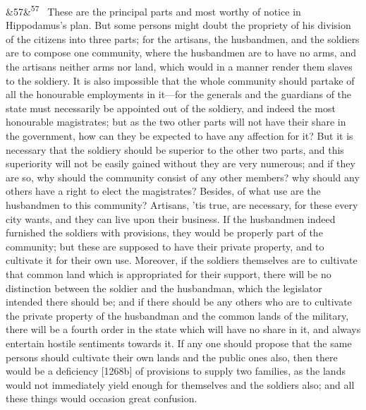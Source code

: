 \documentclass[12pt]{article}
\newcommand{\para}[1][]{\par\noindent\ifx&#1&\else\textsuperscript{\footnotesize #1}~\fi}
\begin{document}
\para[57] These are the principal parts and most worthy of notice in Hippodamus's plan. But some persons might doubt the propriety of his division of the citizens into three parts; for the artisans, the husbandmen, and the soldiers are to compose one community, where the husbandmen are to have no arms, and the artisans neither arms nor land, which would in a manner render them slaves to the soldiery. It is also impossible that the whole community should partake of all the honourable employments in it---for the generals and the guardians of the state must necessarily be appointed out of the soldiery, and indeed the most honourable magistrates; but as the two other parts will not have their share in the government, how can they be expected to have any affection for it? But it is necessary that the soldiery should be superior to the other two parts, and this superiority will not be easily gained without they are very numerous; and if they are so, why should the community consist of any other members? why should any others have a right to elect the magistrates? Besides, of what use are the husbandmen to this community? Artisans, 'tis true, are necessary, for these every city wants, and they can live upon their business. If the husbandmen indeed furnished the soldiers with provisions, they would be properly part of the community; but these are supposed to have their private property, and to cultivate it for their own use. Moreover, if the soldiers themselves are to cultivate that common land which is appropriated for their support, there will be no distinction between the soldier and the husbandman, which the legislator intended there should be; and if there should be any others who are to cultivate the private property of the husbandman and the common lands of the military, there will be a fourth order in the state which will have no share in it, and always entertain hostile sentiments towards it. If any one should propose that the same persons should cultivate their own lands and the public ones also, then there would be a deficiency [1268b] of provisions to supply two families, as the lands would not immediately yield enough for themselves and the soldiers also; and all these things would occasion great confusion.
\end{document}

